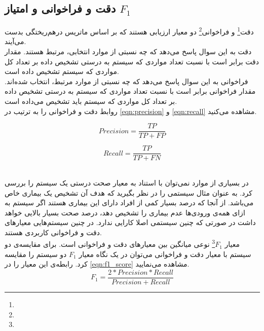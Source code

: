 \subsection{دقت و فراخوانی و امتیاز $F_{1}$}
دقت\footnote{} و فراخوانی\footnote{} دو معیار ارزیابی هستند که بر اساس ماتریس درهم‌ریختگی بدست می‌آیند. \\
دقت به این سوال پاسخ می‌دهد که چه نسبتی از موارد انتخابی، مرتبط هستند. مقدار دقت برابر است با نسبت تعداد مواردی که سیستم به درستی تشخیص داده بر تعداد کل مواردی که سیستم تشخیص داده است.\\
فراخوانی به این سوال پاسخ می‌دهد که چه نسبتی از موارد مرتبط، انتخاب شده‌اند. مقدار فراخوانی برابر است با نسبت تعداد مواردی که سیستم به درستی تشخیص داده بر تعداد کل مواردی که سیستم باید تشخیص می‌داده است.\\
روابط دقت و فراخوانی را به ترتیب در \ref{eqn:precision} و \ref{eqn:recall} مشاهده می‌کنید.

\begin{center}
	\begin{minipage}[b]{.45\textwidth}
		\begin{equation}
			\label{eqn:precision}
			Precision = \frac{TP}{TP + FP}
		\end{equation}
	\end{minipage}
	\quad
	\begin{minipage}[b]{.45\textwidth}
		\begin{equation}
			\label{eqn:recall}
			Recall = \frac{TP}{TP + FN}
		\end{equation}
	\end{minipage}
\end{center}
~\\
در بسیاری از موارد نمی‌توان با استناد به معیار صحت درستی یک سیستم را بررسی کرد. به عنوان مثال سیستمی را در نظر بگیرید که هدف آن تشخیص یک بیماری خاص می‌باشد. از آنجا که درصد بسیار کمی از افراد دارای این بیماری هستند اگر سیستم به ازای همه‌ی ورودی‌ها عدم بیماری را تشخیص دهد، درصد صحت بسیار بالایی خواهد داشت در صورتی که چنین سیستمی اصلا کارایی ندارد. در چنین سیستم‌هایی معیارهای دقت و فراخوانی کاربردی هستند.\\
معیار $F_{1}$\footnote{} نوعی میانگین بین معیارهای دقت و فراخوانی است. برای مقایسه‌ی دو سیستم با معیار دقت و فراخوانی می‌توان در یک نگاه معیار $F_{1}$ دو سیستم را مقایسه کرد. رابطه‌ی این معیار را در \ref{eqn:f1_score} مشاهده می‌نمایید.
\begin{equation}
\label{eqn:f1_score}
F_{1} = \frac{2 * Precision * Recall}{Precision + Recall}
\end{equation}

